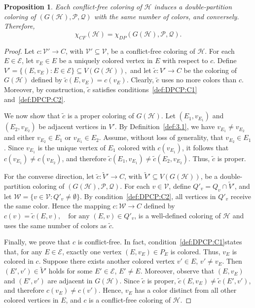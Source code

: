 \documentclass[preprint, 11pt, authoryear]{elsarticle}
\newtheorem{proposition}{Proposition}[section]
\newcommand{\hip}{{\mathcal H}}
\newcommand{\VV}{{\mathcal V}}
\newcommand{\EE}{{\mathcal E}}
\newcommand{\PP}{{\mathcal P}}
\newcommand{\QQ}{{\mathcal Q}}
\newcommand{\CG}[1]{G(#1)}
\newcommand{\cfcn}[1]{\chi_{CF}(#1)}
\newcommand{\dpcn}[1]{\chi_{DP}(#1)}
\begin{document}
 

\begin{proposition}\label{prop.cfcp.as.dpcp}
Each conflict-free coloring of $\hip$ induces a double-partition coloring of $(\CG{\hip}, \PP, \QQ)$ with the same number of colors, and conversely. Therefore, $$
\cfcn{\hip}=\dpcn{\CG{\hip}, \PP, \QQ}.
$$

\end{proposition}


\begin{proof}
Let $c:\VV' \to C$, with $\VV' \subseteq \VV$, be a conflict-free coloring of $\hip$. For each $E \in \EE$, let $v_E \in E$ be a uniquely colored vertex in $E$ with respect to $c$. Define 
$
V' = \{(E,v_E) : E \in \EE\} \subseteq V(\CG{\hip}),
$
and let $\tilde c:V' \to C$ be the coloring of $\CG{\hip}$ defined by $\tilde c(E,v_E) = c(v_E)$.
Clearly, $\tilde c$ uses no more colors than $c$. 
Moreover, by construction, $\tilde c$ satisfies conditions~\ref{def:DPCP:C1} and~\ref{def:DPCP:C2}.

We now show that $\tilde c$ is a proper coloring of $\CG{\hip}$. 
Let $(E_1,v_{E_1})$ and $(E_2,v_{E_2})$ be adjacent vertices in $V'$. 
By Definition~\ref{def:3.1}, we have $v_{E_1} \neq v_{E_2}$ and either $v_{E_2} \in E_1$ or $v_{E_1} \in E_2$. 
Assume, without loss of generality, that $v_{E_2} \in E_1$. 
Since $v_{E_1}$ is the unique vertex of $E_1$ colored with $c(v_{E_1})$, it follows that $c(v_{E_1}) \neq c(v_{E_2})$, and therefore $\tilde c(E_1,v_{E_1}) \neq \tilde c(E_2,v_{E_2})$. Thus, $\tilde c$ is proper.

For the converse direction, let $\tilde c:\tilde{V}' \to C$, with $\tilde{V}'  \subseteq V(\CG{\hip})$, 
be a double-partition coloring of $(\CG{\hip},\PP,\QQ)$. 
For each $v \in \VV$, define
$Q'_v = Q_v \cap \tilde{V}' $,
and let $\mathcal{W} = \{ v \in \VV : Q'_v \neq \emptyset \}$.
By condition~\ref{def:DPCP:C2}, all vertices in $Q'_v$ receive the same color. 
Hence the mapping $c:\mathcal{W} \to C$ defined by
$c(v) = \tilde c(E,v), \quad \text{for any } (E,v) \in Q'_v$,
is a well-defined coloring of $\hip$ and uses the same number of colors as $\tilde c$.

Finally, we prove that $c$ is conflict-free. In fact, condition~\ref{def:DPCP:C1}states that, for any $E \in \EE$, exactly one vertex $(E,v_E) \in P_E$ is colored. 
Thus, $v_E$ is colored in $c$. 
Suppose there exists another colored vertex $v' \in E$, $v' \neq v_E$. Then $(E',v') \in \tilde{V}'$ holds for some $E' \in \EE$,  $E' \neq E$. Moreover,  observe that
$(E,v_E)$ and $(E',v')$ are adjacent in $\CG{\hip}$.
Since $\tilde c$ is proper, $\tilde c(E,v_E) \neq \tilde c(E',v')$, and therefore $c(v_E) \neq c(v')$.
Hence, $v_E$ has a color distinct from all other colored vertices in $E$, 
and $c$ is a conflict-free coloring of $\hip$.
\end{proof}
\end{document}
